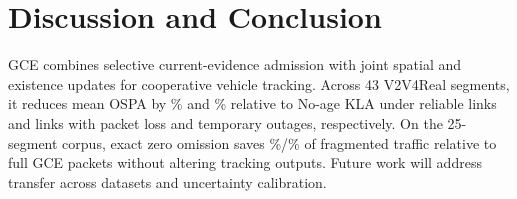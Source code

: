 \section{Discussion and Conclusion}
GCE combines selective current-evidence admission with joint spatial
and existence updates for cooperative vehicle tracking.
Across 43 V2V4Real segments, it reduces mean OSPA by
\FollowGainNoAgeReliable\% and \FollowGainNoAgeIntermittent\% relative to
No-age KLA under reliable links and links with packet loss and temporary
outages, respectively. On the 25-segment corpus, exact zero omission
saves \CodecWireSavingReliable\%/\CodecWireSavingIntermittent\% of
fragmented traffic relative to full GCE packets without altering
tracking outputs. Future work will address transfer across datasets
and uncertainty calibration.
